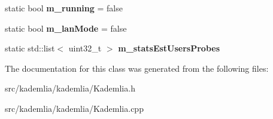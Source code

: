 \begin{DoxyCompactItemize}
\item 
static bool {\bfseries m\_\-running} = false\label{classKademlia_1_1CKademlia_abfae94e447aa5a881329c8518a4c4470}

\item 
static bool {\bfseries m\_\-lanMode} = false\label{classKademlia_1_1CKademlia_a6e368d536ee25282378adb5484a8806d}

\item 
static std::list$<$ uint32\_\-t $>$ {\bfseries m\_\-statsEstUsersProbes}\label{classKademlia_1_1CKademlia_ae6b07f0581f9b013c4b1254992cf3db5}

\end{DoxyCompactItemize}


The documentation for this class was generated from the following files:\begin{DoxyCompactItemize}
\item 
src/kademlia/kademlia/Kademlia.h\item 
src/kademlia/kademlia/Kademlia.cpp\end{DoxyCompactItemize}
